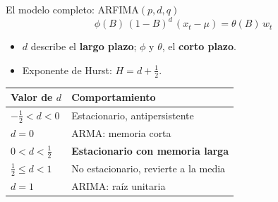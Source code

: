 \documentclass[aspectratio=169,11pt]{beamer}
\newcommand{\destacar}[1]{\textcolor{udeaverde}{\textbf{#1}}}
\begin{document}
\begin{frame}{El modelo completo: ARFIMA$(p,d,q)$}
\[
\phi(B)\,(1-B)^{d}\,(x_t-\mu) = \theta(B)\,w_t
\]
\begin{itemize}
\item $d$ describe el \destacar{largo plazo}; $\phi$ y $\theta$, el \destacar{corto plazo}.
\item Exponente de Hurst: \;$H = d + \tfrac12$.
\end{itemize}
\vspace{0.2cm}
\centering
\begin{tabular}{ll}
\toprule
\textbf{Valor de $d$} & \textbf{Comportamiento} \\
\midrule
$-\tfrac12 < d < 0$ & Estacionario, antipersistente \\
$d = 0$ & ARMA: memoria corta \\
\rowcolor{udeaclaro} $0 < d < \tfrac12$ & \textbf{Estacionario con memoria larga} \\
$\tfrac12 \le d < 1$ & No estacionario, revierte a la media \\
$d = 1$ & ARIMA: raíz unitaria \\
\bottomrule
\end{tabular}
\end{frame}
\end{document}
